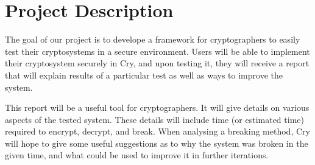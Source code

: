 \section{Project Description}

The goal of our project is to develope a framework for cryptographers to easily test their
cryptosystems in a secure environment. Users will be able to implement their cryptosystem securely
in Cry, and upon testing it, they will receive a report that will explain results of a particular
test as well as ways to improve the system.

This report will be a useful tool for cryptographers. It will give details on various aspects of the
tested system. These details will include time (or estimated time) required to encrypt, decrypt, and break.
When analysing a breaking method, Cry will hope to give some useful suggestions as to why the system was
broken in the given time, and what could be used to improve it in further iterations.

